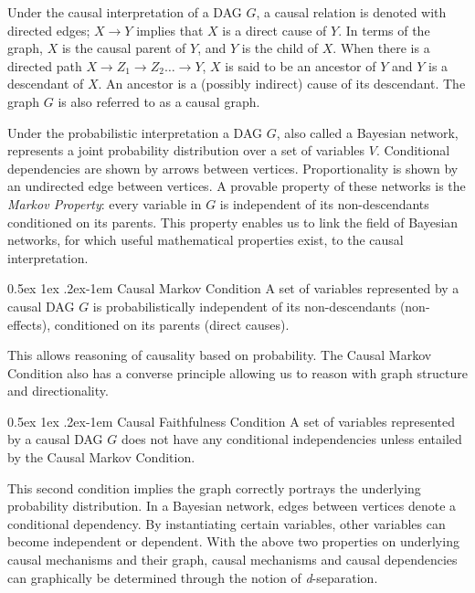 \documentclass[a4paper, 10pt, english, onecolumn]{article}
\makeatletter
\renewcommand{\paragraph}{%
  \@startsection{paragraph}{4}%
  {\z@}{0.5ex \@plus 1ex \@minus .2ex}{-1em}%
  {\normalfont\normalsize\bfseries}%
}
\makeatother
\begin{document}
Under the causal interpretation of a DAG $G$, a causal relation is denoted with directed edges; $X \rightarrow Y$ implies that $X$ is a direct cause of $Y$.
In terms of the graph, $X$ is the causal parent of $Y$, and $Y$ is the child of $X$. 
When there is a directed path $X \rightarrow Z_1 \rightarrow Z_2 \dots \rightarrow Y$, $X$ is said to be an ancestor of $Y$ and $Y$ is a descendant of $X$.
An ancestor is a (possibly indirect) cause of its descendant.
The graph $G$ is also referred to as a causal graph.

Under the probabilistic interpretation a DAG $G$, also called a Bayesian network, represents a joint probability distribution over a set of variables $V$.
Conditional dependencies are shown by arrows between vertices.
Proportionality is shown by an undirected edge between vertices.
A provable property of these networks is the \textit{Markov Property}: every variable in $G$ is independent of its non-descendants conditioned on its parents.
This property enables us to link the field of Bayesian networks, for which useful mathematical properties exist, to the causal interpretation.

\paragraph{Causal Markov Condition}
A set of variables represented by a causal DAG $G$ is probabilistically independent of its non-descendants (non-effects), conditioned on its parents (direct causes).

This allows reasoning of causality based on probability.
The Causal Markov Condition also has a converse principle allowing us to reason with graph structure and directionality.

\paragraph{Causal Faithfulness Condition}
A set of variables represented by a causal DAG $G$ does not have any conditional independencies unless entailed by the Causal Markov Condition.

This second condition implies the graph correctly portrays the underlying probability distribution.
In a Bayesian network, edges between vertices denote a conditional dependency.
By instantiating certain variables, other variables can become independent or dependent.
With the above two properties on underlying causal mechanisms and their graph, causal mechanisms and causal dependencies can graphically be determined through the notion of \textit{d}-separation.
\end{document}
